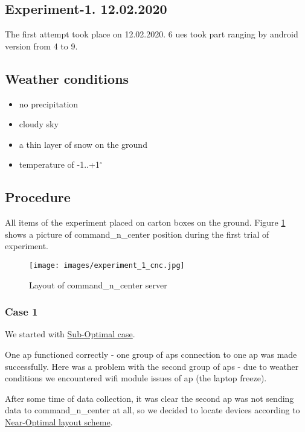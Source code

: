 \subsection{Experiment-1. 12.02.2020}\label{experiment-1.-12.02.2020}

The first attempt took place on 12.02.2020. 6 \Glspl{ue} took part ranging by \gls{android} version from 4 to 9.

\subsection{Weather conditions}

\begin{itemize}
	\tightlist
	\item
	no precipitation
	\item
	cloudy sky
	\item
	a thin layer of snow on the ground
	\item
	temperature of -1..+1$^\circ$
\end{itemize}

\subsection{Procedure}

All items of the experiment placed on carton boxes on the ground. Figure \ref{fig:cnc-position} shows a picture of \gls{command_n_center} position during the first trial of experiment.

\begin{figure}[H]
	\centering
	\texttt{[image: images/experiment\_1\_cnc.jpg]}
	\caption{Layout of \gls{command_n_center} server}
	\label{fig:cnc-position}
\end{figure}

\subsubsection{Case 1}

We started with \hyperref[sub-optimal-layout]{Sub-Optimal case}.

One \gls{ap} functioned correctly - one group of \glspl{ap} connection to one \gls{ap} was made successfully.
Here was a problem with the second group of \glspl{ap} - due to weather conditions we encountered \gls{wifi} module issues of \gls{ap} (the laptop freeze).

After some time of data collection, it was clear the second \gls{ap} was not sending data to \gls{command_n_center} at all, so we decided to locate devices according to \hyperref[near-optimal-layout]{Near-Optimal layout scheme}.

